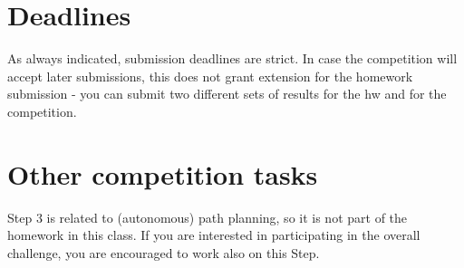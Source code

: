 \documentclass[a4paper,twoside,10pt]{article}
\begin{document}
\section{Deadlines}
As always indicated, submission deadlines are strict. In case the competition will accept later submissions, this does not grant extension for the homework submission - you can submit two different sets of results for the hw and for the competition.

\section{Other competition tasks}
Step 3 is related to (autonomous) path planning, so it is not part of the homework in this class. If you are interested in participating in the overall challenge, you are encouraged to work also on this Step.
\end{document}
